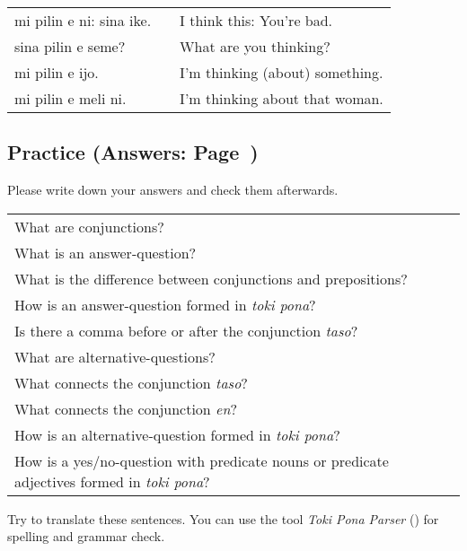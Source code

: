 {\begin{supertabular}{p{5,5cm}|ll}
mi pilin e ni: sina ike. && I think this: You're bad. \\ 
sina pilin e seme? && What are you thinking? \\
mi pilin e ijo. && I'm thinking (about) something. \\
mi pilin e meli ni. && I'm thinking about that woman. \\
\end{supertabular} 
%
%
% 
\newpage
%
\subsection*{Practice (Answers: Page~\pageref{'conjunctions_temperature'})}
%
Please write down your answers and check them afterwards. 

\begin{supertabular}{p{5,5cm}|ll}
What are conjunctions? &&  \\ %
What is an answer-question? &&  \\ %
What is the difference between conjunctions and prepositions? &&  \\ %
How is an answer-question formed in \textit{toki pona}? &&  \\ %
Is there a comma before or after the conjunction \textit{taso}? &&  \\ %
What are alternative-questions? &&   \\ %
What connects the conjunction \textit{taso}? &&   \\ %
What connects the conjunction \textit{en}? &&  \\ %
How is an alternative-question formed in \textit{toki pona}? &&  \\ %
How is a yes/no-question with predicate nouns or predicate adjectives formed in \textit{toki pona}? &&  \\ %
\end{supertabular}

Try to translate these sentences. 
You can use the tool \textit{Toki Pona Parser} (\cite{www:rowa:02}) for spelling and grammar check. 


}
